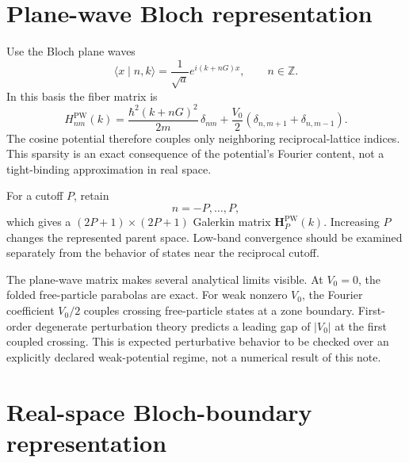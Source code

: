 \section*{Plane-wave Bloch representation}

Use the Bloch plane waves
\begin{equation}
    \langle x\mid n,k\rangle
    =
    \frac{1}{\sqrt a}
    e^{i(k+nG)x},
    \qquad
    n\in\mathbb Z.
\end{equation}
In this basis the fiber matrix is
\begin{equation}
    H^{\mathrm{PW}}_{nm}(k)
    =
    \frac{\hbar^2(k+nG)^2}{2m}\,\delta_{nm}
    +
    \frac{V_0}{2}
    \left(
        \delta_{n,m+1}+\delta_{n,m-1}
    \right).
\end{equation}
The cosine potential therefore couples only neighboring reciprocal-lattice
indices. This sparsity is an exact consequence of the potential's Fourier
content, not a tight-binding approximation in real space.

For a cutoff $P$, retain
\begin{equation}
    n=-P,\ldots,P,
\end{equation}
which gives a $(2P+1)\times(2P+1)$ Galerkin matrix
$\mathbf H_P^{\mathrm{PW}}(k)$. Increasing $P$ changes the represented parent
space. Low-band convergence should be examined separately from the behavior of
states near the reciprocal cutoff.

The plane-wave matrix makes several analytical limits visible. At $V_0=0$, the
folded free-particle parabolas are exact. For weak nonzero $V_0$, the Fourier
coefficient $V_0/2$ couples crossing free-particle states at a zone boundary.
First-order degenerate perturbation theory predicts a leading gap of
$|V_0|$ at the first coupled crossing. This is expected perturbative behavior
to be checked over an explicitly declared weak-potential regime, not a
numerical result of this note.

\section*{Real-space Bloch-boundary representation}

